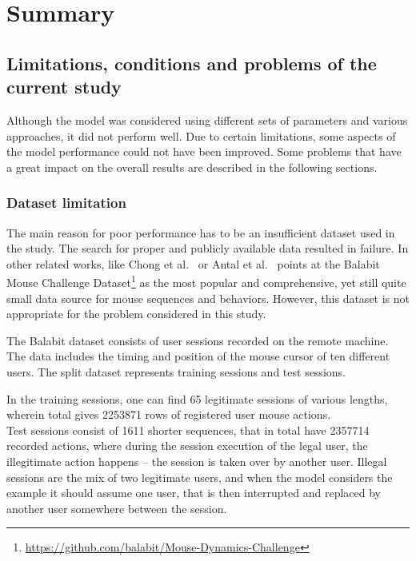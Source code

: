 \chapter{Summary}\label{ch:summary}


\section{Limitations, conditions and problems of the current study}\label{sec:limitations-conditions-problems}
Although the model was considered using different sets of parameters and various approaches, it did not perform well.
Due to certain limitations, some aspects of the model performance could not have been improved.
Some problems that have a great impact on the overall results are described in the following sections.

\subsection{Dataset limitation}\label{subsec:dataset-limitation}
The main reason for poor performance has to be an insufficient dataset used in the study.
The search for proper and publicly available data resulted in failure.
In other related works, like Chong et al.~\cite{Main} or Antal et al.~\cite{balabit1} points at the Balabit Mouse Challenge Dataset\footnote{\url{https://github.com/balabit/Mouse-Dynamics-Challenge}} as the most popular and comprehensive, yet still quite small data source for mouse sequences and behaviors.
However, this dataset is not appropriate for the problem considered in this study.

The Balabit dataset consists of user sessions recorded on the remote machine.
The data includes the timing and position of the mouse cursor of ten different users.
The split dataset represents training sessions and test sessions.

In the training sessions, one can find \num{65} legitimate sessions of various lengths, wherein total gives \num{2253871} rows of registered user mouse actions.\\
Test sessions consist of \num{1611} shorter sequences, that in total have \num{2357714} recorded actions, where during the session execution of the legal user, the illegitimate action happens – the session is taken over by another user.
Illegal sessions are the mix of two legitimate users, and when the model considers the example it should assume one user, that is then interrupted and replaced by another user somewhere between the session.

